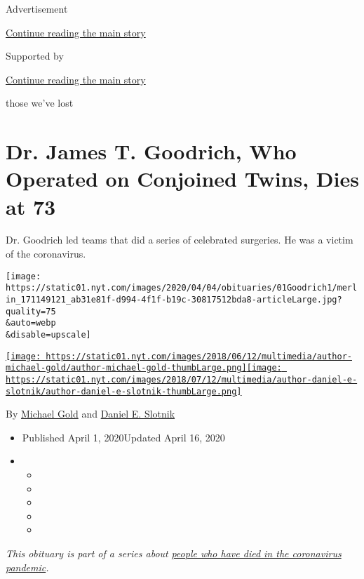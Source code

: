 Advertisement

\protect\hyperlink{after-top}{Continue reading the main story}

Supported by

\protect\hyperlink{after-sponsor}{Continue reading the main story}

those we've lost

\hypertarget{dr-james-t-goodrich-who-operated-on-conjoined-twins-dies-at-73}{%
\section{Dr. James T. Goodrich, Who Operated on Conjoined Twins, Dies at
73}\label{dr-james-t-goodrich-who-operated-on-conjoined-twins-dies-at-73}}

Dr. Goodrich led teams that did a series of celebrated surgeries. He was
a victim of the coronavirus.

\texttt{[image: https://static01.nyt.com/images/2020/04/04/obituaries/01Goodrich1/merlin\_171149121\_ab31e81f-d994-4f1f-b19c-30817512bda8-articleLarge.jpg?quality=75\\\&auto=webp\\\&disable=upscale]}

\href{https://www.nytimes.com/by/michael-gold}{\texttt{[image: https://static01.nyt.com/images/2018/06/12/multimedia/author-michael-gold/author-michael-gold-thumbLarge.png]}}\href{https://www.nytimes.com/by/daniel-e-slotnik}{\texttt{[image: https://static01.nyt.com/images/2018/07/12/multimedia/author-daniel-e-slotnik/author-daniel-e-slotnik-thumbLarge.png]}}

By \href{https://www.nytimes.com/by/michael-gold}{Michael Gold} and
\href{https://www.nytimes.com/by/daniel-e-slotnik}{Daniel E. Slotnik}

\begin{itemize}
\item
  Published April 1, 2020Updated April 16, 2020
\item
  \begin{itemize}
  \item
  \item
  \item
  \item
  \item
  \end{itemize}
\end{itemize}

\emph{This obituary is part of a series about}
\href{https://www.nytimes.com/series/people-who-have-died-of-the-coronavirus}{\emph{people
who have died in the coronavirus pandemic}}\emph{.}

